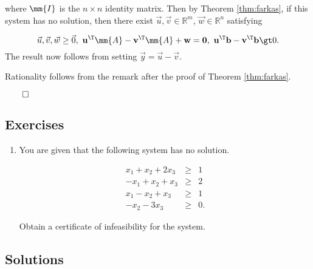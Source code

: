 where \(\mm{I}\) is the \(n\times n\) identity matrix. Then by Theorem
\ref{thm:farkas}, if this system has no solution, then there exist
\(\vec{u}, \vec{v} \in \mathbb{R}^m\), \(\vec{w} \in \mathbb{R}^n\)
satisfying

\[\vec{u},\vec{v},\vec{w} \geq \vec{0},~
\mathbf{u}^\T\mm{A} -
\mathbf{v}^\T\mm{A} +
\mathbf{w} = \mathbf{0},~
\mathbf{u}^\T\mathbf{b} -
\mathbf{v}^\T\mathbf{b} \gt 0.
\] The result now follows from setting \(\vec{y} = \vec{u} - \vec{v}\).

Rationality follows from the remark after the proof of Theorem
\ref{thm:farkas}.

\(\qed\)

\subsection*{Exercises}\label{exercises-4}

\begin{enumerate}
\def\labelenumi{\arabic{enumi}.}
\tightlist
\item
  You are given that the following system has no solution.

  \begin{eqnarray*}
  x_1 + x_2 + 2x_3& \geq & 1 \\
  -x_1 + x_2 + x_3 & \geq & 2 \\
  x_1-x_2 + x_3  & \geq & 1 \\
  -x_2 - 3x_3 & \geq & 0.
  \end{eqnarray*}

  Obtain a certificate of infeasibility for the system.
\end{enumerate}

\subsection*{Solutions}\label{solutions-4}

